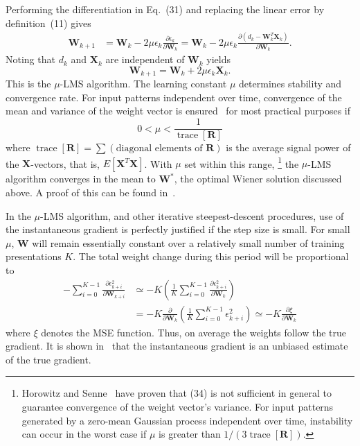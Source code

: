 \documentclass[10pt,twocolumn]{article}
\newcommand{\X}{\bm{X}}
\newcommand{\W}{\bm{W}}
\newcommand{\R}{\bm{R}}
\newcommand{\trace}{\operatorname{trace}}
\begin{document}
Performing the differentiation in Eq.~(31) and replacing the linear error by
definition~(11) gives
\begin{align}
\W_{k+1} &= \W_k - 2\mu\epsilon_k\frac{\partial\epsilon_k}{\partial\W_k}
= \W_k - 2\mu\epsilon_k\frac{\partial(d_k-\W_k^{T}\X_k)}{\partial\W_k}. \tag{32}
\end{align}
Noting that $d_k$ and $\X_k$ are independent of $\W_k$ yields
\begin{equation}
\W_{k+1} = \W_k + 2\mu\epsilon_k\X_k. \tag{33}
\end{equation}
This is the $\mu$-LMS algorithm. The learning constant $\mu$ determines stability
and convergence rate. For input patterns independent over time, convergence of the
mean and variance of the weight vector is ensured~\cite{asp} for most practical
purposes if
\begin{equation}
0 < \mu < \frac{1}{\trace[\R]} \tag{34}
\end{equation}
where $\trace[\R] = \sum(\text{diagonal elements of }\R)$ is the average signal
power of the $\X$-vectors, that is, $E[\X^{T}\X]$. With $\mu$ set within this
range,%
\footnote{Horowitz and Senne~\cite{horowitz} have proven that (34) is not sufficient
in general to guarantee convergence of the weight vector's variance. For input
patterns generated by a zero-mean Gaussian process independent over time,
instability can occur in the worst case if $\mu$ is greater than $1/(3\trace[\R])$.}
the $\mu$-LMS algorithm converges in the mean to $\W^{*}$, the optimal Wiener
solution discussed above. A proof of this can be found in~\cite{asp}.

In the $\mu$-LMS algorithm, and other iterative steepest-descent procedures, use of
the instantaneous gradient is perfectly justified if the step size is small. For
small $\mu$, $\W$ will remain essentially constant over a relatively small number of
training presentations $K$. The total weight change during this period will be
proportional to
\begin{equation}
\begin{aligned}
-\sum_{i=0}^{K-1}\frac{\partial\epsilon_{k+i}^2}{\partial\W_{k+i}}
&\simeq -K\!\left(\frac{1}{K}\sum_{i=0}^{K-1}\frac{\partial\epsilon_{k+i}^2}{\partial\W_k}\right)\\
&= -K\frac{\partial}{\partial\W_k}\!\left(\frac{1}{K}\sum_{i=0}^{K-1}\epsilon_{k+i}^2\right)
\simeq -K\frac{\partial\xi}{\partial\W_k}
\end{aligned}\tag{35}
\end{equation}
where $\xi$ denotes the MSE function. Thus, on average the weights follow the true
gradient. It is shown in~\cite{asp} that the instantaneous gradient is an unbiased
estimate of the true gradient.
\end{document}
